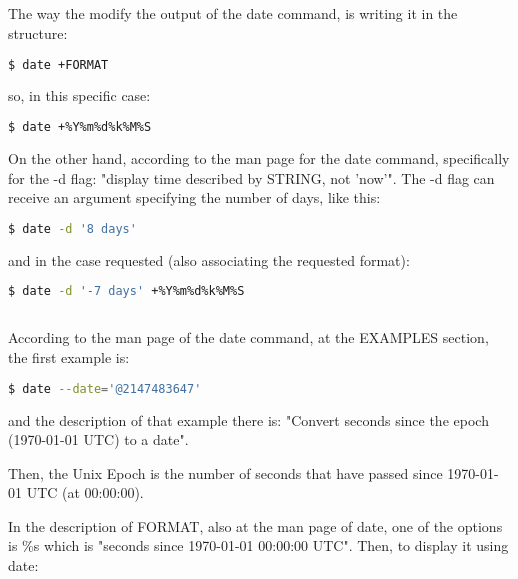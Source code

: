 \documentclass[paper=a4, fontsize=11pt]{scrartcl} %
\numberwithin{equation}{section} %
\numberwithin{figure}{section} %
\numberwithin{table}{section} %
\begin{document}
\begin{onehalfspacing}
\subsection{\textbf{}}

The way the modify the output of the date command, is writing it in the structure:

\begin{lstlisting}[language=bash]
  $ date +FORMAT
\end{lstlisting}

so, in this specific case:

\begin{lstlisting}[language=bash]
  $ date +%Y%m%d%k%M%S
\end{lstlisting}

On the other hand, according to the man page for the date command, specifically for the -d flag: "display time described by STRING, not 'now'". The -d flag can receive an argument specifying the number of days, like this:

\begin{lstlisting}[language=bash]
  $ date -d '8 days'
\end{lstlisting}

and in the case requested (also associating the requested format):

\begin{lstlisting}[language=bash]
  $ date -d '-7 days' +%Y%m%d%k%M%S
\end{lstlisting}


\subsection{\textbf{}}

According to the man page of the date command, at the EXAMPLES section, the first example is:

\begin{lstlisting}[language=bash]
  $ date --date='@2147483647'
\end{lstlisting}

and the description of that example there is: "Convert seconds since the epoch (1970-01-01 UTC) to a date".

Then, the Unix Epoch is the number of seconds that have passed since 1970-01-01 UTC (at 00:00:00).

In the description of FORMAT, also at the man page of date, one of the options is \%s which is "seconds since 1970-01-01 00:00:00 UTC". Then, to display it using date:


\end{onehalfspacing}
\end{document}
